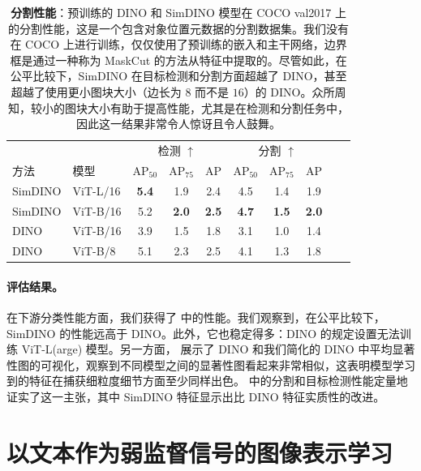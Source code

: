 \documentclass[../../book-main_zh.tex]{subfiles}
\begin{document}
\begin{table}
\caption{\small\textbf{分割性能}：预训练的 DINO 和 SimDINO 模型在 COCO val2017 \citep{lin2014microsoft} 上的分割性能，这是一个包含对象位置元数据的分割数据集。我们没有在 COCO 上进行训练，仅仅使用了预训练的嵌入和主干网络，边界框是通过一种称为 MaskCut \citep{wang2023cut} 的方法从特征中提取的。尽管如此，在公平比较下，SimDINO 在目标检测和分割方面超越了 DINO，甚至超越了使用更小图块大小（边长为 \(8\) 而不是 \(16\)）的 DINO。众所周知，较小的图块大小有助于提高性能，尤其是在检测和分割任务中，因此这一结果非常令人惊讶且令人鼓舞。}
\centering
\begin{tabular}{@{}llcccccccc@{}}
    \toprule
    &  & \multicolumn{3}{c}{检测 $\uparrow$} &
    \multicolumn{3}{c}{分割 $\uparrow$} \\
    方法 & 模型 & AP$_{50}$  & AP$_{75}$ & AP & AP$_{50}$ &
    AP$_{75}$ & AP  \\
    \midrule
    SimDINO &ViT-L/16 &\bf 5.4 &1.9 &2.4 &4.5 &1.4 &1.9 \\
    SimDINO &ViT-B/16 &5.2 & \bf 2.0 & \bf 2.5 & \bf4.7 & \bf 1.5 & \bf 2.0 \\
    DINO &ViT-B/16 &3.9 &1.5 &1.8 &3.1 &1.0 &1.4 \\
    \midrule
    \color{gray} DINO & \color{gray} ViT-B/8 & \color{gray}5.1 &
    \color{gray}2.3 & \color{gray}2.5 & \color{gray}4.1 &
    \color{gray}1.3 & \color{gray}1.8 \\
    \bottomrule
\end{tabular}
\label{tab:dino_segmentation}
\end{table}

\paragraph{评估结果。} 在下游分类性能方面，我们获得了  中的性能。我们观察到，在公平比较下，SimDINO 的性能远高于 DINO。此外，它也稳定得多：DINO 的规定设置无法训练 ViT-L(arge) 模型。另一方面， 展示了 DINO 和我们简化的 DINO 中平均显著性图的可视化，观察到不同模型之间的显著性图看起来非常相似，这表明模型学习到的特征在捕获细粒度细节方面至少同样出色。 中的分割和目标检测性能定量地证实了这一主张，其中 SimDINO 特征显示出比 DINO 特征实质性的改进。

\section{以文本作为弱监督信号的图像表示学习}\label{sec:CLIP}
\end{document}
